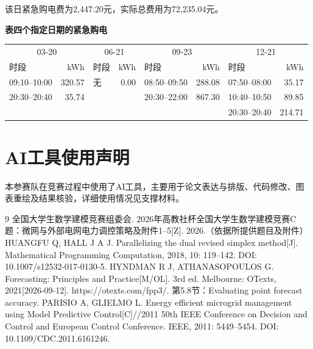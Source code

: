 \documentclass[12pt,a4paper,fontset=windows]{ctexart}
\newcommand{\papertable}[1]{\refstepcounter{table}\label{tab:\thetable}\textbf{表\thetable\quad #1}}
\begin{document}
该日紧急购电费为2,447.20元，实际总费用为72,235.04元。

\par\addvspace{6pt}\noindent\begin{minipage}{\linewidth}\centering\small\setlength{\tabcolsep}{2pt}\papertable{四个指定日期的紧急购电}\par\vspace{4pt}
\begin{tabular}{lrlrlrlr}\toprule

\multicolumn{2}{c}{03-20} & \multicolumn{2}{c}{06-21} & \multicolumn{2}{c}{09-23} & \multicolumn{2}{c}{12-21} \\

时段 & kWh & 时段 & kWh & 时段 & kWh & 时段 & kWh \\ \midrule

09:10--10:00 & 320.57 & 无 & 0.00 & 08:50--09:50 & 288.08 & 07:50--08:00 & 35.17 \\
20:30--20:40 & 35.74 &  &  & 20:30--22:00 & 867.30 & 10:40--10:50 & 89.85 \\
 &  &  &  &  &  & 20:30--20:40 & 214.71 \\

\bottomrule\end{tabular}\end{minipage}\par\addvspace{6pt}


\section*{AI工具使用声明}
本参赛队在竞赛过程中使用了AI工具，主要用于论文表达与排版、代码修改、图表重绘及结果核验，详细使用情况见支撑材料。
\begin{thebibliography}{9}
 全国大学生数学建模竞赛组委会. 2026年高教社杯全国大学生数学建模竞赛C题：微网与外部电网电力调控策略及附件1--5[Z]. 2026.（依据所提供题目及附件）
 HUANGFU Q, HALL J A J. Parallelizing the dual revised simplex method[J]. Mathematical Programming Computation, 2018, 10: 119--142. DOI: 10.1007/s12532-017-0130-5.
 HYNDMAN R J, ATHANASOPOULOS G. Forecasting: Principles and Practice[M/OL]. 3rd ed. Melbourne: OTexts, 2021[2026-09-12]. https://otexts.com/fpp3/. 第5.8节：Evaluating point forecast accuracy.
 PARISIO A, GLIELMO L. Energy efficient microgrid management using Model Predictive Control[C]//2011 50th IEEE Conference on Decision and Control and European Control Conference. IEEE, 2011: 5449--5454. DOI: 10.1109/CDC.2011.6161246.
\end{thebibliography}

\clearpage

\end{document}
